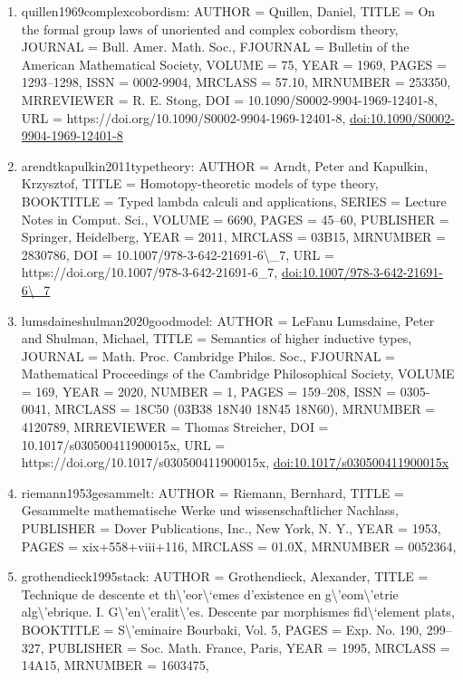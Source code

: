\documentclass[11pt]{article}
\begin{document}
\begin{enumerate}[leftmargin=*]
  \item quillen1969complexcobordism: AUTHOR = Quillen, Daniel, TITLE = On the formal group laws of unoriented and complex cobordism theory, JOURNAL = Bull. Amer. Math. Soc., FJOURNAL = Bulletin of the American Mathematical Society, VOLUME = 75, YEAR = 1969, PAGES = 1293--1298, ISSN = 0002-9904, MRCLASS = 57.10, MRNUMBER = 253350, MRREVIEWER = R. E. Stong, DOI = 10.1090/S0002-9904-1969-12401-8, URL = https://doi.org/10.1090/S0002-9904-1969-12401-8, \href{https://doi.org/10.1090/S0002-9904-1969-12401-8}{doi:10.1090/S0002-9904-1969-12401-8}
  \item arendtkapulkin2011typetheory: AUTHOR = Arndt, Peter and Kapulkin, Krzysztof, TITLE = Homotopy-theoretic models of type theory, BOOKTITLE = Typed lambda calculi and applications, SERIES = Lecture Notes in Comput. Sci., VOLUME = 6690, PAGES = 45--60, PUBLISHER = Springer, Heidelberg, YEAR = 2011, MRCLASS = 03B15, MRNUMBER = 2830786, DOI = 10.1007/978-3-642-21691-6\textbackslash{}\_7, URL = https://doi.org/10.1007/978-3-642-21691-6\_7, \href{https://doi.org/10.1007/978-3-642-21691-6\textbackslash{}\_7}{doi:10.1007/978-3-642-21691-6\textbackslash{}\_7}
  \item lumsdaineshulman2020goodmodel: AUTHOR = LeFanu Lumsdaine, Peter and Shulman, Michael, TITLE = Semantics of higher inductive types, JOURNAL = Math. Proc. Cambridge Philos. Soc., FJOURNAL = Mathematical Proceedings of the Cambridge Philosophical Society, VOLUME = 169, YEAR = 2020, NUMBER = 1, PAGES = 159--208, ISSN = 0305-0041, MRCLASS = 18C50 (03B38 18N40 18N45 18N60), MRNUMBER = 4120789, MRREVIEWER = Thomas Streicher, DOI = 10.1017/s030500411900015x, URL = https://doi.org/10.1017/s030500411900015x, \href{https://doi.org/10.1017/s030500411900015x}{doi:10.1017/s030500411900015x}
  \item riemann1953gesammelt: AUTHOR = Riemann, Bernhard, TITLE = Gesammelte mathematische Werke und wissenschaftlicher Nachlass, PUBLISHER = Dover Publications, Inc., New York, N. Y., YEAR = 1953, PAGES = xix+558+viii+116, MRCLASS = 01.0X, MRNUMBER = 0052364,
  \item grothendieck1995stack: AUTHOR = Grothendieck, Alexander, TITLE = Technique de descente et th\textbackslash{}'eor\textbackslash{}`emes d'existence en g\textbackslash{}'eom\textbackslash{}'etrie alg\textbackslash{}'ebrique. I. G\textbackslash{}'en\textbackslash{}'eralit\textbackslash{}'es. Descente par morphismes fid\textbackslash{}`element plats, BOOKTITLE = S\textbackslash{}'eminaire Bourbaki, Vol. 5, PAGES = Exp. No. 190, 299--327, PUBLISHER = Soc. Math. France, Paris, YEAR = 1995, MRCLASS = 14A15, MRNUMBER = 1603475,

\end{enumerate}
\end{document}
